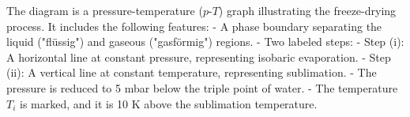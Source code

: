 The diagram is a pressure-temperature (\( p \)-\( T \)) graph illustrating the freeze-drying process. It includes the following features:  
- A phase boundary separating the liquid ("flüssig") and gaseous ("gasförmig") regions.  
- Two labeled steps:  
  - Step (i): A horizontal line at constant pressure, representing isobaric evaporation.  
  - Step (ii): A vertical line at constant temperature, representing sublimation.  
- The pressure is reduced to 5 mbar below the triple point of water.  
- The temperature \( T_i \) is marked, and it is 10 K above the sublimation temperature.